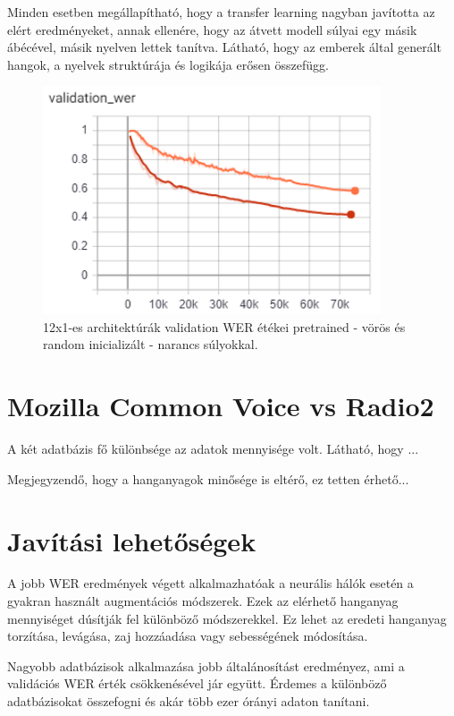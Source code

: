Minden esetben megállapítható, hogy a transfer learning nagyban javította az elért eredményeket, annak ellenére, hogy az átvett modell súlyai egy másik ábécével, másik nyelven lettek tanítva.  Látható, hogy az emberek által generált hangok, a nyelvek struktúrája és logikája erősen összefügg.

\begin{figure}[!ht]
\centering
\includegraphics[width=100mm, keepaspectratio]{figures/12x1_pretrained_vs_random.png}
\caption{12x1-es architektúrák validation WER étékei pretrained - vörös és random inicializált - narancs súlyokkal.}
\end{figure}

\section{Mozilla Common Voice vs Radio2}

A két adatbázis fő különbsége az adatok mennyisége volt. Látható, hogy ...


Megjegyzendő, hogy a hanganyagok minősége is eltérő, ez tetten érhető...

\section{Javítási lehetőségek}

A jobb WER eredmények végett alkalmazhatóak a neurális hálók esetén a gyakran használt augmentációs módszerek. Ezek az elérhető hanganyag mennyiséget dúsítják fel különböző módszerekkel. Ez lehet az eredeti hanganyag torzítása, levágása, zaj hozzáadása vagy sebességének módosítása.

Nagyobb adatbázisok alkalmazása jobb általánosítást eredményez, ami a validációs WER érték csökkenésével jár együtt. Érdemes a különböző adatbázisokat összefogni és akár több ezer órányi adaton tanítani.


